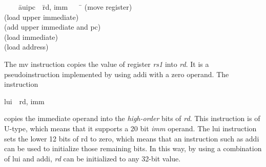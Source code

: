 \documentclass[11pt, twoside, pdftex]{article}
\newenvironment{ctabbing}%
{\begin{center}\begin{minipage}{\textwidth}\begin{tabbing}}
{\end{tabbing}\end{minipage}\end{center}}
\begin{document}
\vspace{-\baselineskip}
\begin{ctabbing}
~~~~\={\sf auipc}~~\={\sf rd, imm}~~~~\=\kill
{}  \>(move register)\\
  \>(load upper immediate)\\
  \>(add upper immediate and pc)\\
  \>(load immediate)\\
  \>(load address)\\
\end{ctabbing}
\vspace{-\baselineskip}
The {\sf mv} instruction copies the value of register {\it rs1} into {\it rd}.
It is a pseudoinstruction implemented by using {\sf addi} with a zero operand.
The instruction
\vspace{-\baselineskip}
\begin{center}
{\sf lui~~rd, imm}
\end{center}
\noindent
copies the immediate operand into the {\it high-order} bits of {\it rd}. This instruction
is of U-type, which means that it supports a 20 bit {\it imm} operand. The {\sf lui}
instruction sets the lower 12 bits of rd to zero, which means that an instruction such as
{\sf addi} can be used to initialize those remaining bits. In this way, by using a combination 
of {\sf lui} and {\sf addi}, {\it rd} can be initialized to any 32-bit value. 
\end{document}
